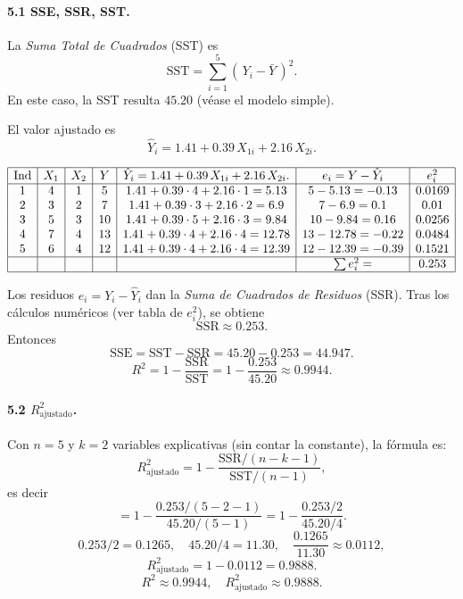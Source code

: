 \documentclass[10pt,a4paper]{article}
\begin{document}
\begin{enumerate}
\begin{enumerate}
\paragraph{5.1 SSE, SSR, SST.}

La \emph{Suma Total de Cuadrados} (SST) es
\[
\text{SST}
= \sum_{i=1}^5 (\,Y_i - \bar{Y}\,)^2.
\]
En este caso, la SST resulta $45.20$ (véase el modelo simple).  

El valor ajustado es
\[
\hat{Y}_i
= 1.41 + 0.39\,X_{1i} + 2.16\,X_{2i}.
\]

\[
\begin{array}{|c|c|c|c|c|c|c|}
\hline
\text{Ind} & X_1 & X_2 &Y 
& \hat{Y}_i = 1.41 + 0.39\,X_{1i} + 2.16\,X_{2i}.
& e_i= Y-\hat{Y}_i
& e_i^2
\\\hline
1 & 4 & 1 &5 
& 1.41 +0.39\cdot4 + 2.16\cdot 1 =5.13
& 5-5.13=-0.13
& 0.0169
\\
2 & 3 &2 &7
& 1.41 +0.39\cdot3 + 2.16\cdot2=6.9
& 7-6.9=0.1
& 0.01
\\
3 & 5 &3 &10
& 1.41 +0.39\cdot5 + 2.16\cdot3=9.84
& 10-9.84=0.16
& 0.0256
\\
4 & 7 &4 &13
& 1.41 +0.39\cdot4 + 2.16\cdot4=12.78
& 13-12.78=-0.22
& 0.0484
\\
5 & 6 &4 &12
& 1.41 +0.39\cdot4 + 2.16\cdot4=12.39
& 12-12.39=-0.39
& 0.1521
\\
\hline
& & & & & \sum e_i^2= & 0.253
\\\hline
\end{array}
\]

Los residuos $e_i=Y_i-\hat{Y}_i$ dan la \emph{Suma de Cuadrados de Residuos} (SSR). Tras los cálculos numéricos (ver tabla de $e_i^2$), se obtiene
\[
\text{SSR} \approx 0.253.
\]
Entonces
\[
\text{SSE}
= \text{SST} - \text{SSR}
= 45.20 - 0.253
= 44.947.
\]
\[
R^2
= 1-\frac{\text{SSR}}{\text{SST}}
= 1 - \frac{0.253}{45.20}
\approx 0.9944.
\]

\paragraph{5.2 $R_{\text{ajustado}}^2$.}

Con $n=5$ y $k=2$ variables explicativas (sin contar la constante), la fórmula es:
\[
R_{\text{ajustado}}^2
= 1
- 
\frac{\text{SSR}/(n-k-1)}{\text{SST}/(n-1)},
\]
es decir
\[
= 1
- 
\frac{0.253/(5-2-1)}{45.20/(5-1)}
= 1
- 
\frac{0.253/2}{45.20/4}.
\]
\[
0.253/2 = 0.1265,
\quad
45.20/4=11.30,
\quad
\frac{0.1265}{11.30}\approx 0.0112,
\]
\[
R_{\text{ajustado}}^2
= 1-0.0112
= 0.9888.
\]
\[
\boxed{
R^2 \approx 0.9944,
\quad
R_{\text{ajustado}}^2 \approx 0.9888.
}
\]


\end{enumerate}
\end{enumerate}
\end{document}
